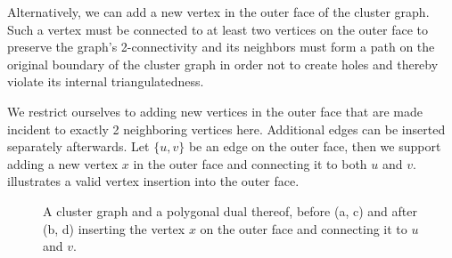 Alternatively, we can add a new vertex in the outer face of the cluster graph. Such a vertex must be connected to at least two vertices on the outer face to preserve the graph's 2-connectivity and its neighbors must form a path on the original boundary of the cluster graph in order not to create holes and thereby violate its internal triangulatedness.

We restrict ourselves to adding new vertices in the outer face that are made incident to exactly 2 neighboring vertices here. Additional edges can be inserted separately afterwards. Let $\{u,v\}$ be an edge on the outer face, then we support adding a new vertex $x$ in the outer face and connecting it to both $u$ and $v$.  illustrates a valid vertex insertion into the outer face.

\begin{figure}[H]
	\centering
	\quad
	\qquad
	\quad
	\caption{A cluster graph and a polygonal dual thereof, before (a, c) and after (b, d) inserting the vertex $x$ on the outer face and connecting it to $u$ and $v$.}
	\label{fig:insert-vertex-example-outside}
\end{figure}

